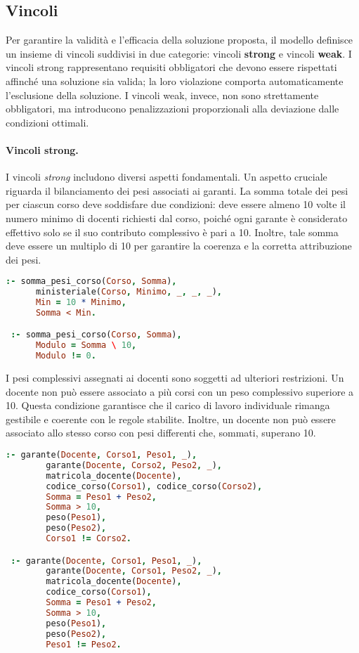 \subsection{Vincoli}\label{sec:constraints}
Per garantire la validità e l'efficacia della soluzione proposta, il modello definisce un insieme di 
vincoli suddivisi in due categorie: vincoli \textbf{strong} e vincoli \textbf{weak}. I vincoli strong 
rappresentano requisiti obbligatori che devono essere rispettati affinché una soluzione sia valida; 
la loro violazione comporta automaticamente l'esclusione della soluzione. I vincoli weak, invece, non 
sono strettamente obbligatori, ma introducono penalizzazioni proporzionali alla deviazione dalle 
condizioni ottimali.

\paragraph{Vincoli strong.}
I vincoli \textit{strong} includono diversi aspetti fondamentali. Un aspetto cruciale riguarda il 
bilanciamento dei pesi associati ai garanti. La somma totale dei pesi per ciascun corso deve soddisfare 
due condizioni: deve essere almeno 10 volte il numero minimo di docenti richiesti dal corso, poiché 
ogni garante è considerato effettivo solo se il suo contributo complessivo è pari a 10. Inoltre, 
tale somma deve essere un multiplo di 10 per garantire la coerenza e la corretta attribuzione dei pesi.

\begin{lstlisting}[language=prolog]
 :- somma_pesi_corso(Corso, Somma),
      ministeriale(Corso, Minimo, _, _, _),
      Min = 10 * Minimo,
      Somma < Min.

 :- somma_pesi_corso(Corso, Somma),
      Modulo = Somma \ 10,
      Modulo != 0.
\end{lstlisting}

I pesi complessivi assegnati ai docenti sono soggetti ad ulteriori restrizioni. Un docente 
non può essere associato a più corsi con un peso complessivo superiore a 10. Questa condizione garantisce 
che il carico di lavoro individuale rimanga gestibile e coerente con le regole stabilite. Inoltre, 
un docente non può essere associato allo stesso corso con pesi differenti che, sommati, superano 10. 

\begin{lstlisting}[language=prolog]
 :- garante(Docente, Corso1, Peso1, _),
        garante(Docente, Corso2, Peso2, _),
        matricola_docente(Docente),
        codice_corso(Corso1), codice_corso(Corso2),
        Somma = Peso1 + Peso2,
        Somma > 10,
        peso(Peso1),
        peso(Peso2),
        Corso1 != Corso2.

 :- garante(Docente, Corso1, Peso1, _),
        garante(Docente, Corso1, Peso2, _),
        matricola_docente(Docente),
        codice_corso(Corso1),
        Somma = Peso1 + Peso2,
        Somma > 10,
        peso(Peso1),
        peso(Peso2),
        Peso1 != Peso2.
\end{lstlisting}

